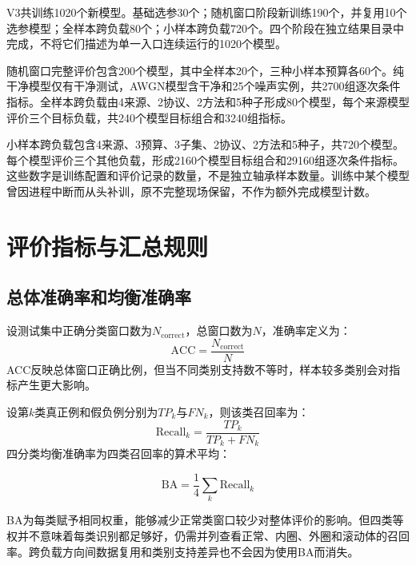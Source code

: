 \documentclass[UTF8,12pt,openany,twoside]{ctexbook}
\numberwithin{equation}{chapter}
\begin{document}
V3共训练1020个新模型。基础选参30个；随机窗口阶段新训练190个，并复用10个选参模型；全样本跨负载80个；小样本跨负载720个。四个阶段在独立结果目录中完成，不将它们描述为单一入口连续运行的1020个模型。

随机窗口完整评价包含200个模型，其中全样本20个，三种小样本预算各60个。纯干净模型仅有干净测试，AWGN模型含干净和25个噪声实例，共2700组逐次条件指标。全样本跨负载由4来源、2协议、2方法和5种子形成80个模型，每个来源模型评价三个目标负载，共240个模型目标组合和3240组指标。

小样本跨负载包含4来源、3预算、3子集、2协议、2方法和5种子，共720个模型。每个模型评价三个其他负载，形成2160个模型目标组合和29160组逐次条件指标。这些数字是训练配置和评价记录的数量，不是独立轴承样本数量。训练中某个模型曾因进程中断而从头补训，原不完整现场保留，不作为额外完成模型计数。

\section{评价指标与汇总规则}\label{ux8bc4ux4ef7ux6307ux6807ux4e0eux6c47ux603bux89c4ux5219}

\subsection{总体准确率和均衡准确率}\label{ux603bux4f53ux51c6ux786eux7387ux548cux5747ux8861ux51c6ux786eux7387}

设测试集中正确分类窗口数为$N_{\mathrm{correct}}$，总窗口数为$N$，准确率定义为：
\begin{equation}
\label{eq:auto16}
\mathrm{ACC}=\frac{N_{\mathrm{correct}}}{N}
\end{equation}
ACC反映总体窗口正确比例，但当不同类别支持数不等时，样本较多类别会对指标产生更大影响。

设第$k$类真正例和假负例分别为$TP_k$与$FN_k$，则该类召回率为：
\begin{equation}
\label{eq:auto17}
\mathrm{Recall}_k=\frac{TP_k}{TP_k+FN_k}
\end{equation}
四分类均衡准确率为四类召回率的算术平均：

\begin{equation}
\label{eq:auto18}
\mathrm{BA}=\frac{1}{4}\sum_k\mathrm{Recall}_k
\end{equation}


BA为每类赋予相同权重，能够减少正常类窗口较少对整体评价的影响。但四类等权并不意味着每类识别都足够好，仍需并列查看正常、内圈、外圈和滚动体的召回率。跨负载方向间数据复用和类别支持差异也不会因为使用BA而消失。
\end{document}
